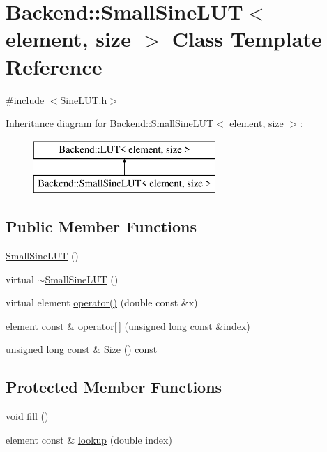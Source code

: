\hypertarget{classBackend_1_1SmallSineLUT}{\section{Backend\+:\+:Small\+Sine\+L\+U\+T$<$ element, size $>$ Class Template Reference}
\label{classBackend_1_1SmallSineLUT}
}


{\ttfamily \#include $<$Sine\+L\+U\+T.\+h$>$}

Inheritance diagram for Backend\+:\+:Small\+Sine\+L\+U\+T$<$ element, size $>$\+:\begin{figure}[H]
\begin{center}
\leavevmode
\includegraphics[height=2.000000cm]{classBackend_1_1SmallSineLUT}
\end{center}
\end{figure}
\subsection*{Public Member Functions}
\begin{DoxyCompactItemize}
\item 
\hyperlink{classBackend_1_1SmallSineLUT_aa89687103cd20a258e5623ace804bf09}{Small\+Sine\+L\+U\+T} ()
\item 
virtual \hyperlink{classBackend_1_1SmallSineLUT_a75767a2ebad8a8c4d8a4a54b7c61bb0e}{$\sim$\+Small\+Sine\+L\+U\+T} ()
\item 
virtual element \hyperlink{classBackend_1_1SmallSineLUT_a2b6fdef4f825da7555ca4002f1dd94af}{operator()} (double const \&x)
\item 
element const \& \hyperlink{classBackend_1_1LUT_a9a7c75f36c72778098a091db3269c29c}{operator\mbox{[}$\,$\mbox{]}} (unsigned long const \&index)
\item 
unsigned long const \& \hyperlink{classBackend_1_1LUT_a3ab84f04569e89cd6046da599c6edbae}{Size} () const 
\end{DoxyCompactItemize}
\subsection*{Protected Member Functions}
\begin{DoxyCompactItemize}
\item 
void \hyperlink{classBackend_1_1SmallSineLUT_a981ef95660709f9a796dc176e4c66cf3}{fill} ()
\item 
element const \& \hyperlink{classBackend_1_1SmallSineLUT_ab4403a4852d61cef8199a3f2cb313c57}{lookup} (double index)
\end{DoxyCompactItemize}
